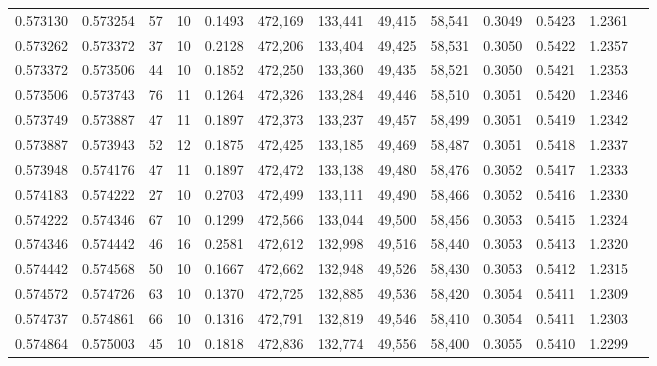 \begin{tabular}{rrrrrrrrrrrrr}
0.573130 & 0.573254 &    57 &  10 &                                     0.1493 & 472,169 & 133,441 &  49,415 &  58,541 & 0.3049 & 0.5423 & 1.2361 \\
0.573262 & 0.573372 &    37 &  10 &                                     0.2128 & 472,206 & 133,404 &  49,425 &  58,531 & 0.3050 & 0.5422 & 1.2357 \\
0.573372 & 0.573506 &    44 &  10 &                                     0.1852 & 472,250 & 133,360 &  49,435 &  58,521 & 0.3050 & 0.5421 & 1.2353 \\
0.573506 & 0.573743 &    76 &  11 &                                     0.1264 & 472,326 & 133,284 &  49,446 &  58,510 & 0.3051 & 0.5420 & 1.2346 \\
0.573749 & 0.573887 &    47 &  11 &                                     0.1897 & 472,373 & 133,237 &  49,457 &  58,499 & 0.3051 & 0.5419 & 1.2342 \\
0.573887 & 0.573943 &    52 &  12 &                                     0.1875 & 472,425 & 133,185 &  49,469 &  58,487 & 0.3051 & 0.5418 & 1.2337 \\
0.573948 & 0.574176 &    47 &  11 &                                     0.1897 & 472,472 & 133,138 &  49,480 &  58,476 & 0.3052 & 0.5417 & 1.2333 \\
0.574183 & 0.574222 &    27 &  10 &                                     0.2703 & 472,499 & 133,111 &  49,490 &  58,466 & 0.3052 & 0.5416 & 1.2330 \\
0.574222 & 0.574346 &    67 &  10 &                                     0.1299 & 472,566 & 133,044 &  49,500 &  58,456 & 0.3053 & 0.5415 & 1.2324 \\
0.574346 & 0.574442 &    46 &  16 &                                     0.2581 & 472,612 & 132,998 &  49,516 &  58,440 & 0.3053 & 0.5413 & 1.2320 \\
0.574442 & 0.574568 &    50 &  10 &                                     0.1667 & 472,662 & 132,948 &  49,526 &  58,430 & 0.3053 & 0.5412 & 1.2315 \\
0.574572 & 0.574726 &    63 &  10 &                                     0.1370 & 472,725 & 132,885 &  49,536 &  58,420 & 0.3054 & 0.5411 & 1.2309 \\
0.574737 & 0.574861 &    66 &  10 &                                     0.1316 & 472,791 & 132,819 &  49,546 &  58,410 & 0.3054 & 0.5411 & 1.2303 \\
0.574864 & 0.575003 &    45 &  10 &                                     0.1818 & 472,836 & 132,774 &  49,556 &  58,400 & 0.3055 & 0.5410 & 1.2299 \\

\end{tabular}
